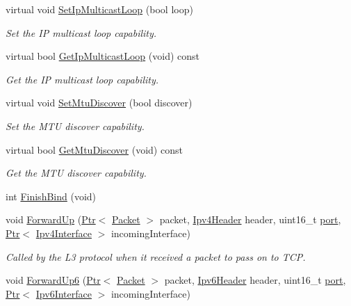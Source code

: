 \begin{DoxyCompactItemize}
virtual void \hyperlink{classns3_1_1UdpSocketImpl_a71747eac52a9dcace2fdd1febf3cab3e}{Set\+Ip\+Multicast\+Loop} (bool loop)
\begin{DoxyCompactList}\small\item\em Set the IP multicast loop capability. \end{DoxyCompactList}\item 
virtual bool \hyperlink{classns3_1_1UdpSocketImpl_ae15a4f99d3a7f7f43068b02f1341abb5}{Get\+Ip\+Multicast\+Loop} (void) const 
\begin{DoxyCompactList}\small\item\em Get the IP multicast loop capability. \end{DoxyCompactList}\item 
virtual void \hyperlink{classns3_1_1UdpSocketImpl_a0f6987b77c5b5635ad779c4c465b8375}{Set\+Mtu\+Discover} (bool discover)
\begin{DoxyCompactList}\small\item\em Set the M\+TU discover capability. \end{DoxyCompactList}\item 
virtual bool \hyperlink{classns3_1_1UdpSocketImpl_a3268aa9137eb2e0a02abbe147c82b5fa}{Get\+Mtu\+Discover} (void) const 
\begin{DoxyCompactList}\small\item\em Get the M\+TU discover capability. \end{DoxyCompactList}\item 
int \hyperlink{classns3_1_1UdpSocketImpl_ab176a2c5ea5e2ba0431a59cbc423c618}{Finish\+Bind} (void)
\item 
void \hyperlink{classns3_1_1UdpSocketImpl_ac7ad1051f59ee35a9083a457bd6c5642}{Forward\+Up} (\hyperlink{classns3_1_1Ptr}{Ptr}$<$ \hyperlink{classns3_1_1Packet}{Packet} $>$ packet, \hyperlink{classns3_1_1Ipv4Header}{Ipv4\+Header} header, uint16\+\_\+t \hyperlink{visualizer-ideas_8txt_a21ff1c530daf8435e00048b7fc2c58e3}{port}, \hyperlink{classns3_1_1Ptr}{Ptr}$<$ \hyperlink{classns3_1_1Ipv4Interface}{Ipv4\+Interface} $>$ incoming\+Interface)
\begin{DoxyCompactList}\small\item\em Called by the L3 protocol when it received a packet to pass on to T\+CP. \end{DoxyCompactList}\item 
void \hyperlink{classns3_1_1UdpSocketImpl_a1550f484c8c62c215a44e8c13694986b}{Forward\+Up6} (\hyperlink{classns3_1_1Ptr}{Ptr}$<$ \hyperlink{classns3_1_1Packet}{Packet} $>$ packet, \hyperlink{classns3_1_1Ipv6Header}{Ipv6\+Header} header, uint16\+\_\+t \hyperlink{visualizer-ideas_8txt_a21ff1c530daf8435e00048b7fc2c58e3}{port}, \hyperlink{classns3_1_1Ptr}{Ptr}$<$ \hyperlink{classns3_1_1Ipv6Interface}{Ipv6\+Interface} $>$ incoming\+Interface)

\end{DoxyCompactItemize}

